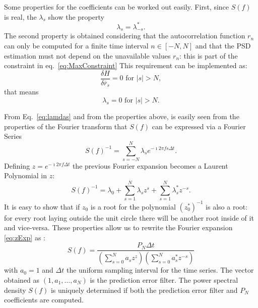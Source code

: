 \documentclass[epj,nopacs]{svjour}
\begin{document}
\begin{appendix}
Some properties for the coefficients can be worked out easily. First, since $S(f)$ is real, the $\lambda_s$ show the property 
\begin{equation}
	\nonumber 
	\lambda_s = \lambda_{-s}^*. 
\end{equation}
The second property is obtained considering that the autocorrelation function $r_n$ can only be computed for a finite time interval $n \in [-N, N]$ and that the PSD estimation must not depend on the unavailable values $r_n$: this is part of the constraint in eq.~\eqref{eq:MaxConstraint}
This requirement can be implemented as:  
\begin{equation}\nonumber 
    \frac{\delta H}{\delta \bar r_s} = 0 \text{ for } \vert s \vert > N,
\end{equation}
that means 
\begin{equation}
\nonumber 
\lambda_s = 0 \text{ for } \vert s \vert > N. 
\end{equation}

From Eq.~\eqref{eq:lamdas} and from the properties above, is easily seen from the properties of the Fourier transform that $S(f)$ can be expressed via a Fourier Series 
\begin{equation}\label{eq:PSDconstraint}
    S(f)^{-1} = \sum_{s = -N}^N \lambda_s e^{-\imath 2 \pi f s \Delta t}.
\end{equation}
Defining $z = e^{-\imath 2 \pi f \Delta t}$ the previous Fourier expansion becomes a Laurent Polynomial in $z$: 
\begin{equation}
    \label{eq:zExp}
    S(f)^{-1} = \lambda_0 + \sum_{s = 1}^N \lambda_s z^s + \sum_{s = 1}^N \lambda^*_s z^{-s}.
\end{equation}
It is easy to show that if $z_0$ is a root for the polynomial $(z_0^*)^{-1}$ is also a root: for every root laying outside the unit circle there will be another root inside of it and vice-versa. These properties allow us to rewrite the Fourier expansion \eqref{eq:zExp} as \cite{1975STIN...7714318B}:
\begin{equation}\label{eq:MESApsd_appendix}
    S(f) = \frac{P_N \Delta t}{\left(\sum_{s=0}^N a_s z^z\right)\left(\sum_{s = 0}^N a^*_s z^{-s}\right)}
\end{equation}
with $a_0 = 1$ and $\Delta t$ the uniform sampling interval for the time series. The vector obtained as $(1, a_1, \dots, a_N)$ is the prediction error filter. The power spectral density $S(f)$ is uniquely determined if both the prediction error filter and $P_N$ coefficients are computed.


\end{appendix}
\end{document}
